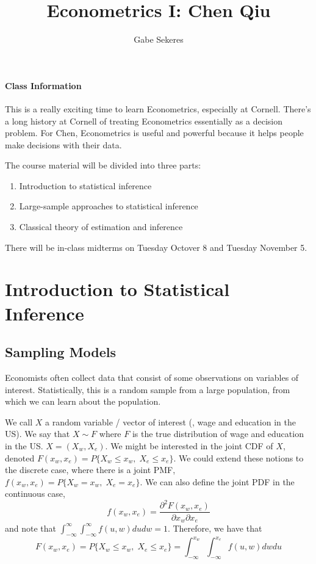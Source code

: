 \documentclass[10pt]{article}
\title{Econometrics I: Chen Qiu}
\author{Gabe Sekeres}
\begin{document}
\maketitle

\tableofcontents

\newpage

\paragraph{Class Information} This is a really exciting time to learn Econometrics, especially at Cornell. There's a long history at Cornell of treating Econometrics essentially as a decision problem. For Chen, Econometrics is useful and powerful because it helps people make decisions with their data.

The course material will be divided into three parts:
\begin{enumerate}
	\item Introduction to statistical inference
	\item Large-sample approaches to statistical inference
	\item Classical theory of estimation and inference
\end{enumerate}

There will be in-class midterms on Tuesday Octover 8 and Tuesday November 5.

\section{Introduction to Statistical Inference}

\subsection{Sampling Models}

Economists often collect data that consist of some observations on variables of interest. Statistically, this is a random sample from a large population, from which we can learn about the population.

We call $X$ a random variable / vector of interest (\eg, wage and education in the US). We say that $X \sim F$ where $F$ is the true distribution of wage and education in the US. $X = (X_w,X_e)$. We might be interested in the joint CDF of $X$, denoted $F(x_w,x_e) = P\{X_w \le x_w,\; X_e \le x_e\}$. We could extend these notions to the discrete case, where there is a joint PMF, $f(x_w,x_e) = P\{X_w = x_w,\;X_e = x_e\}$. We can also define the joint PDF in the continuous case, 
\[
f(x_w,x_e) = \frac{\partial^2 F(x_w,x_e)}{\partial x_w \partial x_e}
\]
and note that $\int_{-\infty}^\infty\int_{-\infty}^\infty f(u,w) dudw = 1$. Therefore, we have that
\[
F(x_w,x_e) = P\{X_w \le x_w,\; X_e \le x_e\} = \int_{-\infty}^{x_w} \int_{-\infty}^{x_e} f(u,w) dw du
\]
\end{document}
